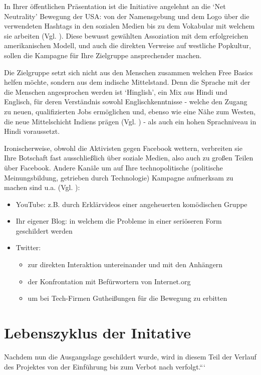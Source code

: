 \documentclass{article}
\begin{document}
In Ihrer öffentlichen Präsentation ist die Initiative angelehnt an die `Net Neutrality' Bewegung der USA: von der Namensgebung und dem Logo über die verwendeten Hashtags in den sozialen Medien bis zu dem Vokabular mit welchem sie arbeiten (Vgl. \cite{prasad2017}).
Diese bewusst gewählten Assoziation mit dem erfolgreichen amerikanischen Modell, und auch die direkten Verweise auf westliche Popkultur, sollen die Kampagne für Ihre Zielgruppe ansprechender machen.

Die Zielgruppe setzt sich nicht aus den Menschen zusammen welchen Free Basics helfen möchte, sondern aus dem indische Mittelstand. Denn die Sprache mit der die Menschen angesprochen werden ist `Hinglish', ein Mix aus Hindi und Englisch, für deren Verständnis sowohl Englischkenntnisse - welche den Zugang zu neuen, qualifizierten Jobs ermöglichen und, ebenso wie eine Nähe zum Westen, die neue Mittelschicht Indiens prägen (Vgl. \cite{fernandes2006}) - als auch ein hohen Sprachniveau in Hindi voraussetzt.

\medskip

Ironischerweise, obwohl die Aktivisten gegen Facebook wettern, verbreiten sie Ihre Botschaft fast ausschließlich über soziale Medien, also auch zu großen Teilen über Facebook. Andere Kanäle um auf Ihre technopolitische (politische Meinungsbildung, getrieben durch Technologie) Kampagne aufmerksam zu machen sind u.a. (Vgl. \cite{prasad2017}):
\begin{itemize}
  \item YouTube: z.B. durch Erklärvideos einer angeheuerten komödischen Gruppe
  \item Ihr eigener Blog: in welchem die Probleme in einer seriöseren Form geschildert werden
  \item Twitter:
    \begin{itemize}
      \item zur direkten Interaktion untereinander und mit den Anhängern
      \item der Konfrontation mit Befürwortern von Internet.org
      \item um bei Tech-Firmen Gutheißungen für die Bewegung zu erbitten
    \end{itemize}
\end{itemize}

\section{Lebenszyklus der Initative}

Nachdem nun die Ausgangslage geschildert wurde, wird in diesem Teil der Verlauf des Projektes von der Einführung bis zum Verbot nach verfolgt.```
\end{document}
